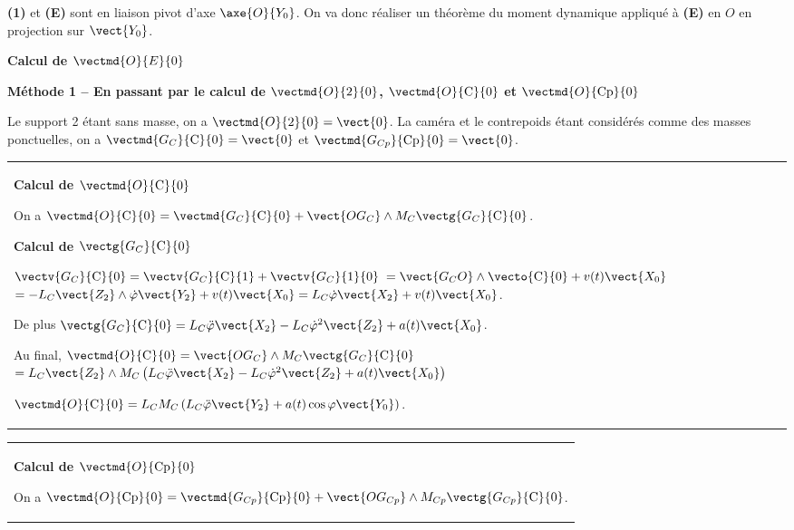 \else
\fi


\ifprof
\begin{corrige}
\textbf{(1)} et \textbf{(E)} sont en liaison pivot d'axe $\axe{O}{Y_0}$. On va donc réaliser un théorème du moment dynamique appliqué à \textbf{(E)} en $O$ en projection sur $\vect{Y_0}$. 

\textbf{Calcul de $\vectmd{O}{E}{0}$}

\textbf{Méthode 1 -- En passant par le calcul de $\vectmd{O}{\text{2}}{0}$, $\vectmd{O}{\text{C}}{0}$ et $\vectmd{O}{\text{Cp}}{0}$}


Le support 2 étant sans masse, on a $\vectmd{O}{\text{2}}{0}=\vect{0}$. La caméra et le contrepoids étant considérés comme des masses ponctuelles, on a $\vectmd{G_C}{\text{C}}{0}=\vect{0}$ et $\vectmd{G_{Cp}}{\text{Cp}}{0}=\vect{0}$.

 \begin{tabular}{|p{.9\linewidth}}
\textbf{Calcul de $\vectmd{O}{\text{C}}{0}$}

 On a $\vectmd{O}{\text{C}}{0} = \vectmd{G_{C}}{\text{C}}{0}+\vect{OG_C} \wedge M_C\vectg{G_{C}}{\text{C}}{0}$.
 
\textbf{Calcul de $\vectg{G_{C}}{\text{C}}{0}$}

$\vectv{G_C}{\text{C}}{0}=\vectv{G_C}{\text{C}}{1}+\vectv{G_C}{\text{1}}{0}$ $=\vect{G_CO}\wedge \vecto{\text{C}}{0}+v(t)\vect{X_0}$ $=-L_C\vect{Z_2}\wedge \dot{\varphi}\vect{Y_2}+v(t)\vect{X_0}=L_C \dot{\varphi}\vect{X_2}+v(t)\vect{X_0}$.

De plus  $\vectg{G_C}{\text{C}}{0}=L_C \ddot{\varphi}\vect{X_2}-L_C \dot{\varphi}^2\vect{Z_2}+a(t)\vect{X_0}$.

Au final, $\vectmd{O}{\text{C}}{0} = \vect{OG_C} \wedge M_C\vectg{G_{C}}{\text{C}}{0}$
$ =L_C\vect{Z_2} \wedge M_C \left( L_C \ddot{\varphi}\vect{X_2}-L_C \dot{\varphi}^2\vect{Z_2}+a(t)\vect{X_0} \right)$

$\vectmd{O}{\text{C}}{0} =L_C M_C \left( L_C \ddot{\varphi}\vect{Y_2} +a(t) \cos \varphi \vect{Y_0} \right)$.

\end{tabular}

\vspace{.25cm}

 \begin{tabular}{|p{.9\linewidth}}
\textbf{Calcul de $\vectmd{O}{\text{Cp}}{0}$}

 On a $\vectmd{O}{\text{Cp}}{0} = \vectmd{G_{Cp}}{\text{Cp}}{0}+\vect{OG_{Cp}} \wedge M_{Cp}\vectg{G_{Cp}}{\text{C}}{0}$.


\end{tabular}
\end{corrige}
